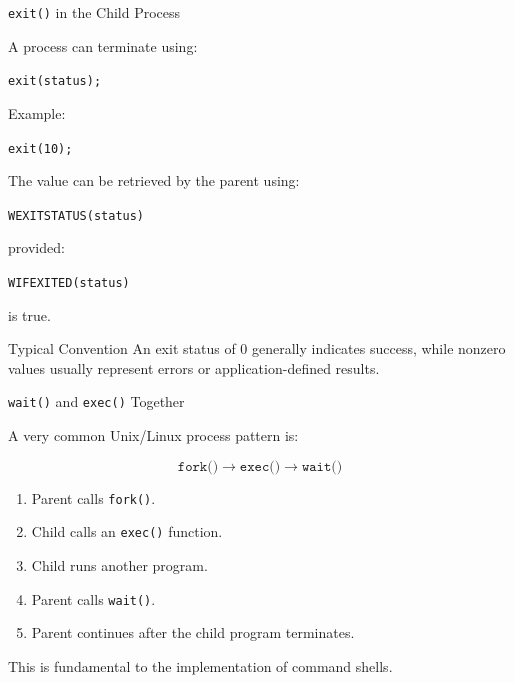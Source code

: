 \documentclass[aspectratio=169]{beamer}
\begin{document}
\begin{frame}{\texttt{exit()} in the Child Process}

A process can terminate using:

\begin{center}
\texttt{exit(status);}
\end{center}

Example:

\begin{center}
\texttt{exit(10);}
\end{center}

The value can be retrieved by the parent using:

\begin{center}
\texttt{WEXITSTATUS(status)}
\end{center}

provided:

\begin{center}
\texttt{WIFEXITED(status)}
\end{center}

is true.

\begin{alertblock}{Typical Convention}
An exit status of 0 generally indicates success, while nonzero values usually
represent errors or application-defined results.
\end{alertblock}

\end{frame}

\begin{frame}{\texttt{wait()} and \texttt{exec()} Together}

A very common Unix/Linux process pattern is:

\[
\boxed{
\texttt{fork()}
\rightarrow
\texttt{exec()}
\rightarrow
\texttt{wait()}
}
\]

\begin{enumerate}

    \item Parent calls \texttt{fork()}.

    \item Child calls an \texttt{exec()} function.

    \item Child runs another program.

    \item Parent calls \texttt{wait()}.

    \item Parent continues after the child program terminates.

\end{enumerate}

This is fundamental to the implementation of command shells.

\end{frame}
\end{document}
